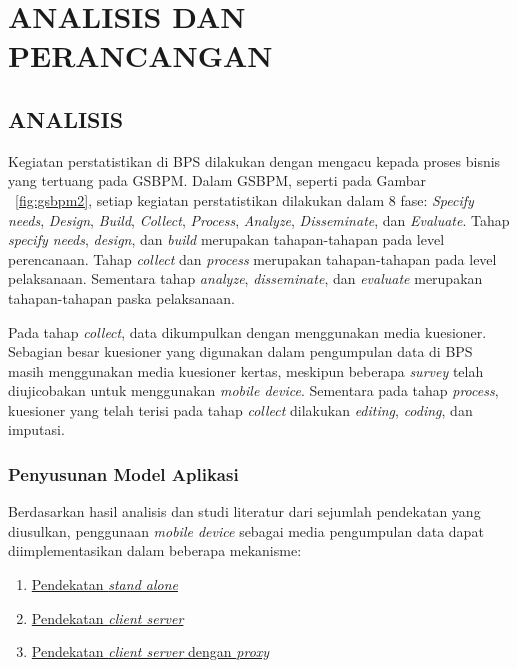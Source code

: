 \chapter{ANALISIS DAN PERANCANGAN}


\section{ANALISIS}

Kegiatan perstatistikan di BPS dilakukan dengan mengacu kepada proses bisnis yang tertuang pada GSBPM. Dalam GSBPM, seperti pada Gambar ~\ref{fig:gsbpm2}, setiap kegiatan perstatistikan dilakukan dalam 8 fase: \textit{Specify needs}, \textit{Design}, \textit{Build}, \textit{Collect}, \textit{Process}, \textit{Analyze}, \textit{Disseminate}, dan \textit{Evaluate}. Tahap \textit{specify needs}, \textit{design}, dan \textit{build} merupakan tahapan-tahapan pada level perencanaan. Tahap \textit{collect} dan \textit{process} merupakan tahapan-tahapan pada level pelaksanaan. Sementara tahap \textit{analyze}, \textit{disseminate}, dan \textit{evaluate} merupakan tahapan-tahapan paska pelaksanaan.


Pada tahap \textit{collect}, data dikumpulkan dengan menggunakan media kuesioner. Sebagian besar kuesioner yang digunakan dalam pengumpulan data di BPS masih menggunakan media kuesioner kertas, meskipun beberapa \textit{survey} telah diujicobakan untuk menggunakan \textit{mobile device}. Sementara pada tahap \textit{process}, kuesioner yang telah terisi pada tahap \textit{collect} dilakukan \textit{editing}, \textit{coding}, dan imputasi. 


\subsection{Penyusunan Model Aplikasi} \label{ssec:analysis-application-model}

Berdasarkan hasil analisis dan studi literatur dari sejumlah pendekatan yang diusulkan, penggunaan \textit{mobile device} sebagai media pengumpulan data dapat diimplementasikan dalam beberapa mekanisme:

\begin{enumerate}
\item \hyperref[sssec:stand-alone]{Pendekatan \textit{stand alone}}
\item \hyperref[sssec:client-server]{Pendekatan \textit{client server}}
\item \hyperref[sssec:client-server-proxy]{Pendekatan \textit{client server} dengan \textit{proxy}}
\end{enumerate}


